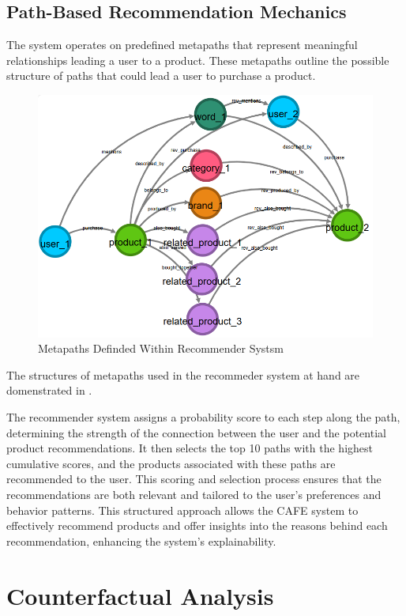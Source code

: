 \subsection{Path-Based Recommendation Mechanics}
The system operates on predefined metapaths that represent meaningful
relationships leading a user to a product. These metapaths outline the possible structure
of paths that could lead a user to purchase a product.
\begin{figure}[h!]
	\begin{center}
		\includegraphics[width=0.9\columnwidth, keepaspectratio]{
			images/metapaths.png
		}
		\caption{Metapaths Definded Within Recommender Systsm}
		\label{fig:metapaths}
	\end{center}
\end{figure}
The structures of metapaths used in the recommeder system at hand are domenstrated
in .

The recommender system assigns a probability score to each step along the path, determining
the strength of the connection between the user and the potential product recommendations.
It then selects the top 10 paths with the highest cumulative scores, and the products
associated with these paths are recommended to the user. This scoring and
selection process ensures that the recommendations are both relevant and
tailored to the user's preferences and behavior patterns. This structured approach
allows the CAFE system to effectively recommend products and offer insights into
the reasons behind each recommendation, enhancing the system's explainability.

\section{Counterfactual Analysis}
